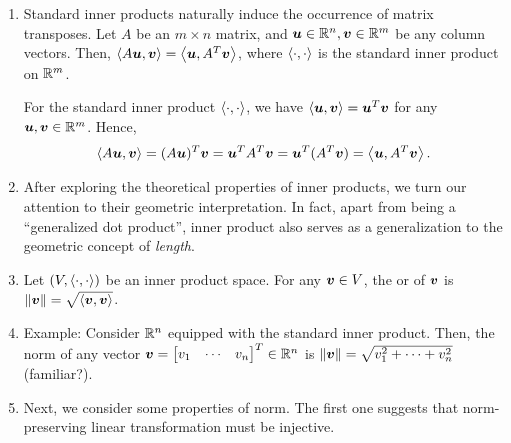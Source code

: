 \begin{enumerate}
\begin{itemize}
\begin{pf}
(4): When \(\vect{v}\ne\vect{0}\), since \(T\) is injective, we must have
\(T(\vect{v})\ne\vect{0}=T(\vect{0})\). Hence,
\[
\inner{\vect{v}}{\vect{v}}_{V}=\inner{T(\vect{v})}{T(\vect{v})}{W}
>0.
\]
\end{pf}

\begin{note}
The injectivity of \(T\) is only needed for proving (4).
\end{note}
\end{itemize}

\item \label{it:std-inner-prod-matx-trans}
Standard inner products naturally induce the occurrence of matrix transposes.
Let \(A\) be an \(m\times n\) matrix, and \(\vb*{u}\in\mathbb{R}^n,\vb*{v}\in\mathbb{R}^m\)
be any column vectors. Then,
\(\left\langle A\vb*{u},\vb*{v}\right\rangle=\left\langle \vb*{u},A^{T}\vb*{v}\right\rangle\), where
\(\left\langle \cdot,\cdot\right\rangle\) is the standard inner product on \(\mathbb{R}^m\).

\begin{pf}
For the standard inner product \(\left\langle \cdot,\cdot\right\rangle\), we have
\(\left\langle \vb*{u},\vb*{v}\right\rangle=\vb*{u}^{T}\vb*{v}\) for any
\(\vb*{u},\vb*{v}\in\mathbb{R}^m\). Hence,
\[
\left\langle A\vb*{u},\vb*{v}\right\rangle
=(A\vb*{u})^{T}\vb*{v}
=\vb*{u}^{T}A^{T}\vb*{v}
=\vb*{u}^{T}(A^{T}\vb*{v})
=\left\langle \vb*{u},A^{T}\vb*{v}\right\rangle.
\]
\end{pf}

\item After exploring the theoretical properties of inner products, we turn our
attention to their geometric interpretation. In fact, apart from being a
``generalized dot product'', inner product also serves as a generalization to
the geometric concept of \emph{length}.

\item Let \((V,\left\langle \cdot,\cdot\right\rangle)\) be an inner product space. For
any \(\vb*{v}\in V\), the  or  of \(\vb*{v}\) is
\(\norm{\vb*{v}}=\sqrt{\left\langle \vb*{v},\vb*{v}\right\rangle}\).

\item Example: Consider \(\mathbb{R}^n\) equipped with the standard inner product.
Then, the norm of any vector \(\vect{v}=\mqty[v_1&\cdots&v_n]^{T}\in\R^n\) is
\(\norm{\vb*{v}}=\sqrt{v_1^2+\dotsb+v_n^2}\) (familiar?).

\item Next, we consider some properties of norm. The first one suggests that
norm-preserving linear transformation must be injective.


\end{enumerate}
